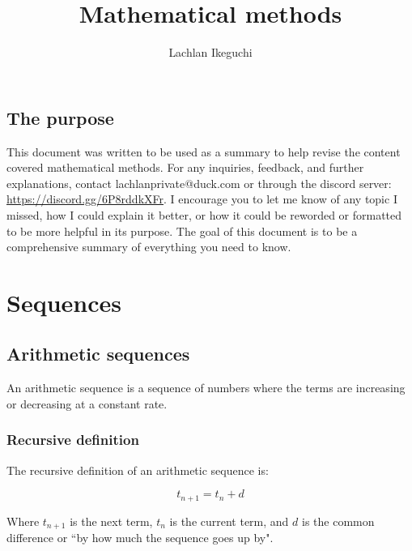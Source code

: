 \documentclass{book}
\title{Mathematical methods}
\author{Lachlan Ikeguchi}
\newenvironment{generalInformation}{}{}
\newenvironment{explanationOfTerms}{}{}
\begin{document}
\maketitle

\tableofcontents



\section{The purpose}
This document was written to be used as a summary to help revise the content covered mathematical methods.  For any inquiries, feedback, and further explanations, contact lachlanprivate@duck.com or through the discord server: \url{https://discord.gg/6P8rddkXFr}. I encourage you to let me know of any topic I missed, how I could explain it better, or how it could be reworded or formatted to be more helpful in its purpose.  The goal of this document is to be a comprehensive summary of everything you need to know.





\chapter{Sequences}
\section{Arithmetic sequences}
\begin{generalInformation}
	An arithmetic sequence is a sequence of numbers where the terms are increasing or decreasing at a constant rate.
\end{generalInformation}


\subsection{Recursive definition}
\begin{generalInformation}
	The recursive definition of an arithmetic sequence is:
\end{generalInformation}

\[
	t_{n + 1} = t_n + d
\]

\begin{explanationOfTerms}
	Where $t_{n + 1}$ is the next term, $t_n$ is the current term, and $d$ is the common difference or ``by how much the sequence goes up by".
\end{explanationOfTerms}
\end{document}
